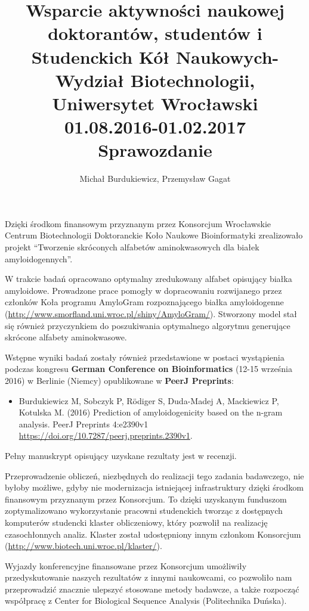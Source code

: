 \documentclass[12pt]{article}
\author{Michał Burdukiewicz, Przemysław Gagat}
\title{\large Wsparcie aktywności naukowej doktorantów, studentów i Studenckich 
  Kół Naukowych- Wydział Biotechnologii, Uniwersytet Wrocławski 
  \\ 
  01.08.2016-01.02.2017 \\ 
  \normalsize Sprawozdanie}
\date{}
\begin{document}
\maketitle

Dzięki środkom finansowym przyznanym przez Konsorcjum Wrocławskie Centrum 
Biotechnologii Doktoranckie Koło Naukowe Bioinformatyki  
zrealizowało projekt ``Tworzenie skróconych alfabetów aminokwasowych dla białek amyloidogennych''.

W trakcie badań opracowano optymalny zredukowany alfabet opisujący białka amyloidowe. 
Prowadzone prace pomogły w dopracowaniu rozwijanego przez członków Koła programu AmyloGram 
rozpoznającego białka amyloidogenne (\url{http://www.smorfland.uni.wroc.pl/shiny/AmyloGram/}).
Stworzony model stał się również przyczynkiem do poszukiwania optymalnego algorytmu generujące 
skrócone alfabety aminokwasowe.

Wstępne wyniki badań zostały również przedstawione w postaci wystąpienia podczas 
kongresu \textbf{German Conference on Bioinformatics} (12-15 września 2016) w 
Berlinie (Niemcy) opublikowane w \textbf{PeerJ Preprints}:
\begin{itemize}
\item Burdukiewicz M, Sobczyk P, Rödiger S, Duda-Madej A, Mackiewicz P, Kotulska M. (2016) Prediction of amyloidogenicity based on the n-gram analysis. PeerJ Preprints 4:e2390v1 \url{https://doi.org/10.7287/peerj.preprints.2390v1}.
\end{itemize}

Pełny manuskrypt opisujący uzyskane rezultaty jest w recenzji.

Przeprowadzenie 
obliczeń, niezbędnych do realizacji tego zadania badawczego, nie byłoby 
możliwe, gdyby nie modernizacja istniejącej infrastruktury dzięki środkom 
finansowym przyznanym przez Konsorcjum. To dzięki uzyskanym funduszom zoptymalizowano wykorzystanie pracowni studenckich tworząc z dostępnych komputerów studencki klaster 
obliczeniowy, który pozwolił na realizację czasochłonnych analiz. Klaster 
został udostępniony innym członkom Konsorcjum (\url{http://www.biotech.uni.wroc.pl/klaster/}). 

Wyjazdy konferencyjne finansowane przez Konsorcjum umożliwiły przedyskutowanie naszych 
rezultatów z innymi naukowcami, co pozwoliło nam przeprowadzić znacznie ulepszyć stosowane metody 
badawcze, a także rozpocząć współpracę z Center for Biological Sequence Analysis (Politechnika Duńska).
\end{document}
